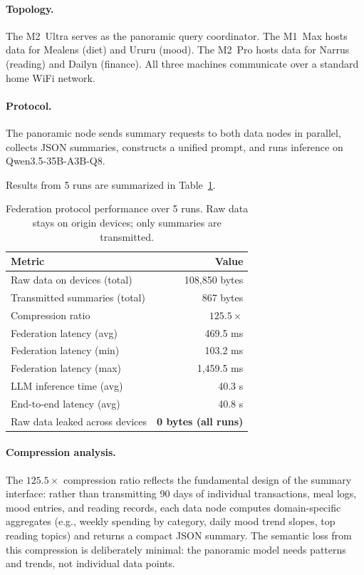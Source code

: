 \documentclass[11pt,a4paper]{article}
\newcommand{\appname}[1]{\textsf{#1}}
\begin{document}
\paragraph{Topology.} The M2~Ultra serves as the panoramic query coordinator.
The M1~Max hosts data for \appname{Mealens} (diet) and \appname{Ururu}
(mood). The M2~Pro hosts data for \appname{Narrus} (reading) and
\appname{Dailyn} (finance). All three machines communicate over a standard
home WiFi network.

\paragraph{Protocol.} The panoramic node sends summary requests to both data
nodes in parallel, collects JSON summaries, constructs a unified prompt, and
runs inference on Qwen3.5-35B-A3B-Q8.

Results from 5 runs are summarized in Table~\ref{tab:federation}.

\begin{table}[H]
\centering
\caption{Federation protocol performance over 5 runs. Raw data stays on
origin devices; only summaries are transmitted.}
\label{tab:federation}
\begin{tabular}{@{}lr@{}}
\toprule
\textbf{Metric} & \textbf{Value} \\
\midrule
Raw data on devices (total)      & 108,850 bytes \\
Transmitted summaries (total)    & 867 bytes \\
Compression ratio                & $125.5\times$ \\
\midrule
Federation latency (avg)         & 469.5 ms \\
Federation latency (min)         & 103.2 ms \\
Federation latency (max)         & 1,459.5 ms \\
\midrule
LLM inference time (avg)         & 40.3 s \\
End-to-end latency (avg)         & 40.8 s \\
\midrule
Raw data leaked across devices   & \textbf{0 bytes (all runs)} \\
\bottomrule
\end{tabular}
\end{table}

\paragraph{Compression analysis.} The $125.5\times$ compression ratio
reflects the fundamental design of the summary interface: rather than
transmitting 90 days of individual transactions, meal logs, mood entries,
and reading records, each data node computes domain-specific aggregates
(e.g., weekly spending by category, daily mood trend slopes, top reading
topics) and returns a compact JSON summary. The semantic loss from this
compression is deliberately minimal: the panoramic model needs patterns and
trends, not individual data points.
\end{document}
